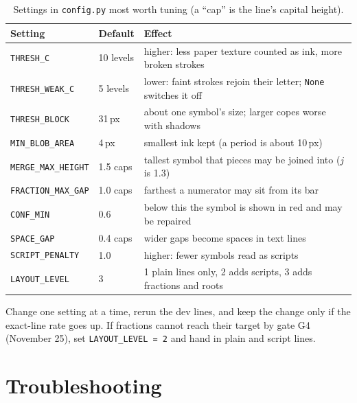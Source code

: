 \documentclass[11pt]{article}
\newcommand{\cmd}[1]{\texttt{#1}}
\begin{document}
\begin{table}[H]
\centering
\begin{tabular}{C{3.4cm}C{1.6cm}C{6.2cm}}
\toprule
\textbf{Setting} & \textbf{Default} & \textbf{Effect} \\
\midrule
\cmd{THRESH\_C} & 10 levels & higher: less paper texture counted as ink, more broken strokes \\
\cmd{THRESH\_WEAK\_C} & 5 levels & lower: faint strokes rejoin their letter; \cmd{None} switches it off \\
\cmd{THRESH\_BLOCK} & 31\,px & about one symbol's size; larger copes worse with shadows \\
\cmd{MIN\_BLOB\_AREA} & 4\,px & smallest ink kept (a period is about 10\,px) \\
\cmd{MERGE\_MAX\_HEIGHT} & 1.5 caps & tallest symbol that pieces may be joined into ($j$ is 1.3) \\
\cmd{FRACTION\_MAX\_GAP} & 1.0 caps & farthest a numerator may sit from its bar \\
\cmd{CONF\_MIN} & 0.6 & below this the symbol is shown in red and may be repaired \\
\cmd{SPACE\_GAP} & 0.4 caps & wider gaps become spaces in text lines \\
\cmd{SCRIPT\_PENALTY} & 1.0 & higher: fewer symbols read as scripts \\
\cmd{LAYOUT\_LEVEL} & 3 & 1 plain lines only, 2 adds scripts, 3 adds fractions and roots \\
\bottomrule
\end{tabular}
\caption{Settings in \cmd{config.py} most worth tuning (a ``cap'' is the line's capital height).}
\end{table}

Change one setting at a time, rerun the dev lines, and keep the change only if the exact-line
rate goes up. If fractions cannot reach their target by gate G4 (November 25), set
\cmd{LAYOUT\_LEVEL = 2} and hand in plain and script lines.

\section{Troubleshooting}
\end{document}
